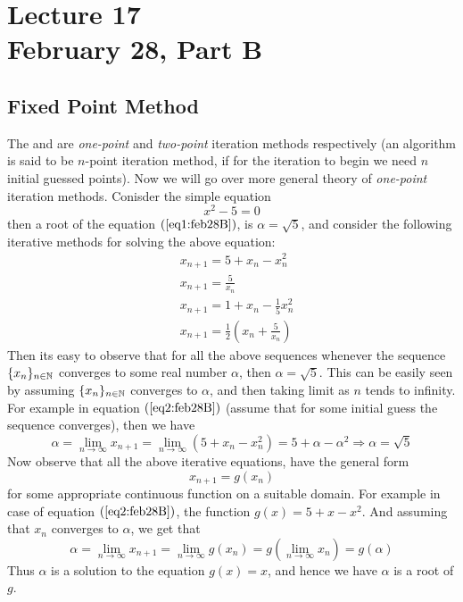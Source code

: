 \chapter*{Lecture 17 \\ February 28, Part B}
\setcounter{chapter}{17}
\setcounter{section}{0}
\setcounter{equation}{0}
\section{Fixed Point Method}

The  and  are \textit{one-point} and \textit{two-point} iteration methods respectively (an algorithm is said to be $n$-point iteration method, if for the iteration to begin we need $n$ initial guessed points). Now we will go over more general theory of \textit{one-point} iteration methods. Conisder the simple equation 
\begin{equation}\label{eq1:feb28B}
    x^2 - 5 = 0
\end{equation}
then a root of the equation $(\ref{eq1:feb28B})$, is $\alpha = \sqrt{5}$, and consider the following iterative methods for solving the above equation: 
\begin{align}\label{eq2:feb28B}
    &x_{n+1} = 5 + x_n - x_n^2 \\ 
    &x_{n+1} = \frac{5}{x_n} \\ 
    &x_{n+1} = 1 + x_n - \frac{1}{5}x_n^2 \\    
    &x_{n+1} = \frac{1}{2}\left(x_n + \frac{5}{x_n}\right)  
\end{align}
Then its easy to observe that for all the above sequences whenever the sequence $\{x_n\}_{n\in\mathbb{N}}$ converges to some real number $\alpha$, then $\alpha = \sqrt{5}$. This can be easily seen by assuming $\{x_n\}_{n \in \mathbb{N}}$ converges to $\alpha$, and then taking limit as $n$ tends to infinity. For example in equation $(\ref{eq2:feb28B})$ (assume that for some initial guess the sequence converges), then we have 
\[
   \alpha = \lim_{n\to\infty} x_{n+1} = \lim_{n\to\infty} \left( 5+x_n-x_n^2 \right) = 5 + \alpha - \alpha^2 \Rightarrow \alpha = \sqrt{5}  
\] 
Now observe that all the above iterative equations, have the general form 
\begin{equation}\label{eq3:feb28B}
    x_{n+1} = g(x_n)
\end{equation}
for some appropriate continuous function on a suitable domain. For example in case of equation $(\ref{eq2:feb28B})$, the function $g(x) = 5+x-x^2$. And assuming that $x_n$ converges to $\alpha$, we get that 
\[
    \alpha = \lim_{n\to\infty} x_{n+1} = \lim_{n\to\infty} g(x_n) = g \left( \lim_{n\to\infty} x_n \right) = g(\alpha)  
\]
Thus $\alpha$ is a solution to the equation $g(x)=x$, and hence we have $\alpha$ is a root of $g$.

